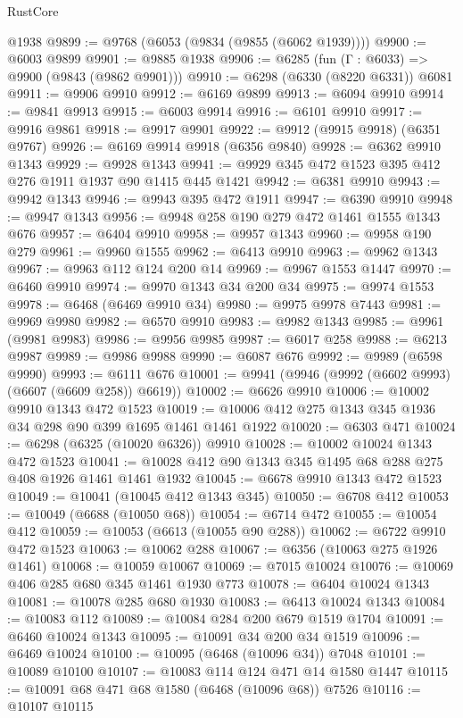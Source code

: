 \begin{lexlean}{RustCore}
\begin{coremodule}
    @1938
@9899 := @9768 (@6053 (@9834 (@9855 (@6062 @1939))))
@9900 := @6003 @9899
@9901 := @9885 @1938
@9906 := @6285 (fun (Γ : @6033) => @9900 (@9843 (@9862 @9901)))
@9910 := @6298 (@6330 (@8220 @6331)) @6081
@9911 := @9906 @9910
@9912 := @6169 @9899
@9913 := @6094 @9910
@9914 := @9841 @9913
@9915 := @6003 @9914
@9916 := @6101 @9910
@9917 := @9916 @9861
@9918 := @9917 @9901
@9922 := @9912 (@9915 @9918) (@6351 @9767)
@9926 := @6169 @9914 @9918 (@6356 @9840)
@9928 := @6362 @9910 @1343
@9929 := @9928 @1343
@9941 := @9929 @345 @472 @1523 @395 @412 @276 @1911 @1937 @90 @1415 @445 @1421
@9942 := @6381 @9910
@9943 := @9942 @1343
@9946 := @9943 @395 @472 @1911
@9947 := @6390 @9910
@9948 := @9947 @1343
@9956 := @9948 @258 @190 @279 @472 @1461 @1555 @1343 @676
@9957 := @6404 @9910
@9958 := @9957 @1343
@9960 := @9958 @190 @279
@9961 := @9960 @1555
@9962 := @6413 @9910
@9963 := @9962 @1343
@9967 := @9963 @112 @124 @200 @14
@9969 := @9967 @1553 @1447
@9970 := @6460 @9910
@9974 := @9970 @1343 @34 @200 @34
@9975 := @9974 @1553
@9978 := @6468 (@6469 @9910 @34)
@9980 := @9975 @9978 @7443
@9981 := @9969 @9980
@9982 := @6570 @9910
@9983 := @9982 @1343
@9985 := @9961 (@9981 @9983)
@9986 := @9956 @9985
@9987 := @6017 @258
@9988 := @6213 @9987
@9989 := @9986 @9988
@9990 := @6087 @676
@9992 := @9989 (@6598 @9990)
@9993 := @6111 @676
@10001 := @9941 (@9946 (@9992 (@6602 @9993) (@6607 (@6609 @258)) @6619))
@10002 := @6626 @9910
@10006 := @10002 @9910 @1343 @472 @1523
@10019 := @10006 @412 @275 @1343 @345 @1936 @34 @298 @90 @399 @1695 @1461 @1461 @1922
@10020 := @6303 @471
@10024 := @6298 (@6325 (@10020 @6326)) @9910
@10028 := @10002 @10024 @1343 @472 @1523
@10041 := @10028 @412 @90 @1343 @345 @1495 @68 @288 @275 @408 @1926 @1461 @1461 @1932
@10045 := @6678 @9910 @1343 @472 @1523
@10049 := @10041 (@10045 @412 @1343 @345)
@10050 := @6708 @412
@10053 := @10049 (@6688 (@10050 @68))
@10054 := @6714 @472
@10055 := @10054 @412
@10059 := @10053 (@6613 (@10055 @90 @288))
@10062 := @6722 @9910 @472 @1523
@10063 := @10062 @288
@10067 := @6356 (@10063 @275 @1926 @1461)
@10068 := @10059 @10067
@10069 := @7015 @10024
@10076 := @10069 @406 @285 @680 @345 @1461 @1930 @773
@10078 := @6404 @10024 @1343
@10081 := @10078 @285 @680 @1930
@10083 := @6413 @10024 @1343
@10084 := @10083 @112
@10089 := @10084 @284 @200 @679 @1519 @1704
@10091 := @6460 @10024 @1343
@10095 := @10091 @34 @200 @34 @1519
@10096 := @6469 @10024
@10100 := @10095 (@6468 (@10096 @34)) @7048
@10101 := @10089 @10100
@10107 := @10083 @114 @124 @471 @14 @1580 @1447
@10115 := @10091 @68 @471 @68 @1580 (@6468 (@10096 @68)) @7526
@10116 := @10107 @10115

\end{coremodule}
\end{lexlean}
